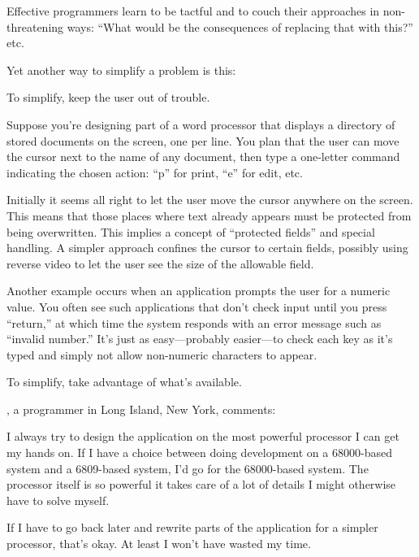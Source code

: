 \noindent Effective programmers learn to be tactful and to couch their
approaches in non-threatening ways: ``What would be the consequences
of replacing that with this?'' etc.

Yet another way to simplify a problem is this:

\begin{tip}
To simplify, keep the user out of trouble.
\end{tip}
\noindent Suppose you're designing part of a word processor that
displays a directory of stored documents on the screen, one per line.
You plan that the
user can move the cursor next to the name of any document, then type a
one-letter command indicating the chosen action: ``p'' for print,
``e'' for edit, etc.

Initially it seems all right to let the user move the cursor anywhere
on the screen. This means that those places where text already appears
must be protected from being overwritten. This implies a concept of
``protected fields'' and special handling. A simpler approach confines
the cursor to certain fields, possibly using reverse video to let the
user see the size of the allowable field.

Another example occurs when an application prompts the user for a
numeric value. You often see such applications that don't check input
until you press ``return,'' at which time the system responds with an
error message such as ``invalid number.'' It's just as easy---probably
easier---to check each key as it's typed and simply not allow
non-numeric characters to appear.

\begin{tip}
To simplify, take advantage of what's available.
\end{tip}%
%
\begin{interview}
, a \Forth{} programmer in Long Island, New York,
comments:

\begin{tfquot}
I always try to design the application on the most powerful processor
I can get my hands on. If I have a choice between doing development on
a 68000-based system and a 6809-based system, I'd go for the
68000-based system. The processor itself is so powerful it takes care
of a lot of details I might otherwise have to solve myself.

If I have to go back later and rewrite parts of the application for a
simpler processor, that's okay. At least I won't have wasted my time.
\end{tfquot}
\end{interview}%

